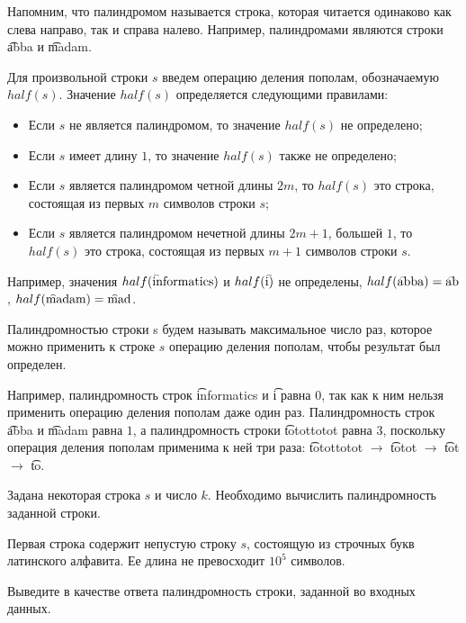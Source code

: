 Напомним, что палиндромом называется строка, которая читается одинаково как слева направо, так и справа налево. Например, палиндромами являются строки \t{abba} и \t{madam}. 

Для произвольной строки $s$ введем операцию деления пополам, обозначаемую $half(s)$. Значение $half(s)$ определяется следующими правилами: 

\begin{itemize}
\item Если $s$ не является палиндромом, то значение $half(s)$ не определено; 
\item Если $s$ имеет длину $1$, то значение $half(s)$ также не определено; 
\item Если $s$ является палиндромом четной длины $2m$, то $half(s)$ это строка, состоящая из первых $m$ символов строки $s$; 
\item Если $s$ является палиндромом нечетной длины $2m + 1$, большей $1$, то $half(s)$ это строка, состоящая из первых $m + 1$ символов строки $s$. 
\end{itemize}

Например, значения $half(\text{\t{informatics}})$ и $half(\text{\t{i}})$ не определены, $half(\text{\t{abba}}) = \text{\t{ab}}$, $half(\text{\t{madam}}) = \text{\t{mad}}$. 

Палиндромностью строки s будем называть максимальное число раз, которое можно применить к строке $s$ операцию деления пополам, чтобы результат был определен. 

Например, палиндромность строк \t{informatics} и \t{i} равна $0$, так как к ним нельзя применить операцию деления пополам даже один раз. Палиндромность строк \t{abba} и \t{madam} равна $1$, а палиндромность строки \t{totottotot} равна $3$, поскольку операция деления пополам применима к ней три раза: \t{totottotot} $\rightarrow$ \t{totot} $\rightarrow$ \t{tot} $\rightarrow$ \t{to}. 

Задана некоторая строка $s$ и число $k$. Необходимо вычислить палиндромность заданной строки. 

\InputFile

Первая строка содержит непустую строку $s$, состоящую из строчных букв латинского алфавита. Ее длина не превосходит $10^5$ символов. 

\OutputFile

Выведите в качестве ответа палиндромность строки, заданной во входных данных. 

\SAMPLES

